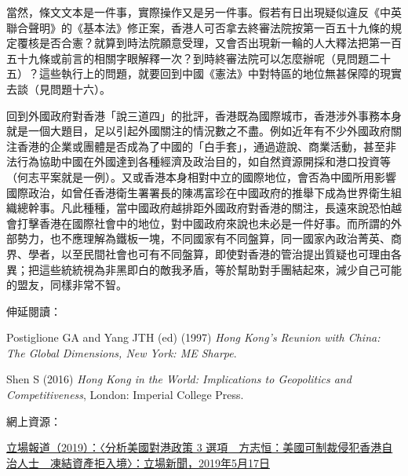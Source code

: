 當然，條文文本是一件事，實際操作又是另一件事。假若有日出現疑似違反《中英聯合聲明》的《基本法》修正案，香港人可否拿去終審法院按第一百五十九條的規定覆核是否合憲？就算到時法院願意受理，又會否出現新一輪的人大釋法把第一百五十九條或前言的相關字眼解釋一次？到時終審法院可以怎麼辦呢（見問題二十五）？這些執行上的問題，就要回到中國《憲法》中對特區的地位無甚保障的現實去談（見問題十六）。

回到外國政府對香港「說三道四」的批評，香港既為國際城市，香港涉外事務本身就是一個大題目，足以引起外國關注的情況數之不盡。例如近年有不少外國政府關注香港的企業或團體是否成為了中國的「白手套」，通過遊說、商業活動，甚至非法行為協助中國在外國達到各種經濟及政治目的，如自然資源開採和港口投資等（何志平案就是一例）。又或香港本身相對中立的國際地位，會否為中國所用影響國際政治，如曾任香港衛生署署長的陳馮富珍在中國政府的推舉下成為世界衛生組織總幹事。凡此種種，當中國政府越排距外國政府對香港的關注，長遠來說恐怕越會打擊香港在國際社會中的地位，對中國政府來說也未必是一件好事。而所謂的外部勢力，也不應理解為鐵板一塊，不同國家有不同盤算，同一國家內政治菁英、商界、學者，以至民間社會也可有不同盤算，即使對香港的管治提出質疑也可理由各異；把這些統統視為非黑即白的敵我矛盾，等於幫助對手團結起來，減少自己可能的盟友，同樣非常不智。

伸延閱讀：

Postiglione GA and Yang JTH (ed) (1997) \textit{Hong Kong’s Reunion with China: The Global Dimensions, New York: ME Sharpe}.

Shen S (2016) \textit{Hong Kong in the World: Implications to Geopolitics and Competitiveness}, London: Imperial College Press.

網上資源：

\href{https://thestandnews.com/politics/分析美國對港政策-3-選項-方志恒-美國可制裁侵犯香港自治人士-凍結資產拒入境/}{立場報道（2019）：〈分析美國對港政策 3 選項　方志恒：美國可制裁侵犯香港自治人士　凍結資產拒入境〉：立場新聞，2019年5月17日}
